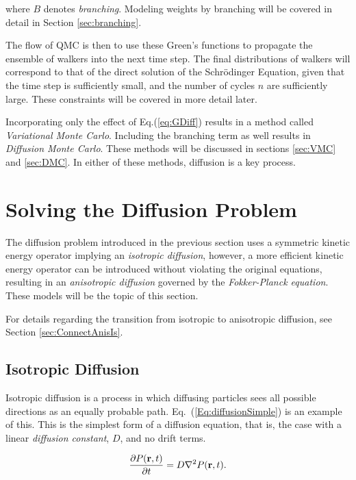 where $B$ denotes \textit{branching}. Modeling weights by branching will be covered in detail in Section \ref{sec:branching}.

The flow of QMC is then to use these Green's functions to propagate the ensemble of walkers into the next time step. The final distributions of walkers will correspond to that of the direct solution of the Schrödinger Equation, given that the time step is sufficiently small, and the number of cycles $n$ are sufficiently large. These constraints will be covered in more detail later. 

Incorporating only the effect of Eq.(\ref{eq:GDiff}) results in a method called \textit{Variational Monte Carlo}. Including the branching term as well results in \textit{Diffusion Monte Carlo}. These methods will be discussed in sections \ref{sec:VMC} and \ref{sec:DMC}. In either of these methods, diffusion is a key process.

\section{Solving the Diffusion Problem}

The diffusion problem introduced in the previous section uses a symmetric kinetic energy operator implying an \textit{isotropic diffusion}, however, a more efficient kinetic energy operator can be introduced without violating the original equations, resulting in an \textit{anisotropic diffusion} governed by the \textit{Fokker-Planck equation}. These models will be the topic of this section. 

For details regarding the transition from isotropic to anisotropic diffusion, see Section \ref{sec:ConnectAnisIs}.

\subsection{Isotropic Diffusion}

Isotropic diffusion is a process in which diffusing particles sees all possible directions as an equally probable path. Eq.~(\ref{Eq:diffusionSimple}) is an example of this. This is the simplest form of a diffusion equation, that is, the case with a linear \textit{diffusion constant}, $D$, and no drift terms.

\begin{equation}
 \label{Eq:diffusionSimple}
 \frac{\partial P(\mathbf{r}, t)}{\partial t} = D\nabla^2 P(\mathbf{r}, t) .
\end{equation}

